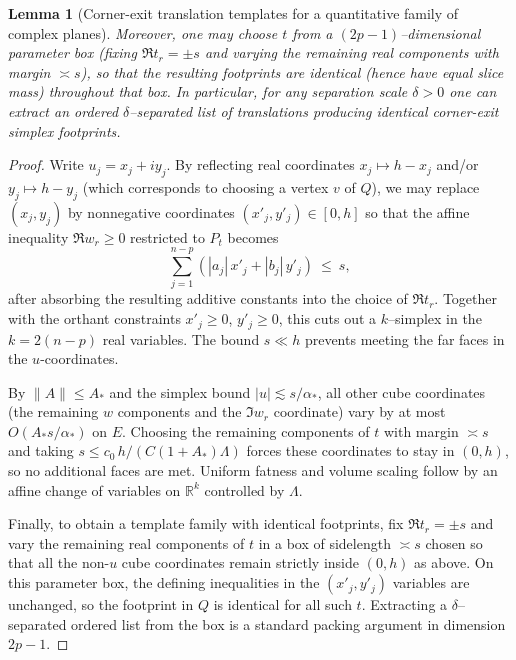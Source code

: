 \documentclass[11pt]{article}
\numberwithin{equation}{section}  %
\theoremstyle{plain}
\newtheorem{lemma}[theorem]{Lemma}
\theoremstyle{definition}
\theoremstyle{remark}
\newcommand{\R}{\mathbb{R}}
\begin{document}
\begin{lemma}[Corner-exit translation templates for a quantitative family of complex planes]
\smallskip\noindent
Moreover, one may choose $t$ from a $(2p\!-\!1)$--dimensional parameter box (fixing $\Re t_r=\pm s$ and varying the remaining real components with margin $\asymp s$),
so that the resulting footprints are \emph{identical} (hence have equal slice mass) throughout that box.  In particular, for any separation scale $\delta>0$ one can
extract an ordered $\delta$--separated list of translations producing identical corner-exit simplex footprints.
\end{lemma}

\begin{proof}
Write $u_j=x_j+i y_j$.
By reflecting real coordinates $x_j\mapsto h-x_j$ and/or $y_j\mapsto h-y_j$ (which corresponds to choosing a vertex $v$ of $Q$),
we may replace $(x_j,y_j)$ by nonnegative coordinates $(x'_j,y'_j)\in[0,h]$ so that the affine inequality
$\Re w_r\ge 0$ restricted to $P_t$ becomes
\[
\sum_{j=1}^{n-p} (|a_j|\,x'_j+|b_j|\,y'_j)\ \le\ s,
\]
after absorbing the resulting additive constants into the choice of $\Re t_r$.
Together with the orthant constraints $x'_j\ge 0$, $y'_j\ge 0$, this cuts out a $k$--simplex in the $k=2(n-p)$ real variables.
The bound $s\ll h$ prevents meeting the far faces in the $u$-coordinates.

\smallskip\noindent
By $\|A\|\le A_*$ and the simplex bound $|u|\lesssim s/\alpha_*$, all other cube coordinates (the remaining $w$ components and the $\Im w_r$ coordinate)
vary by at most $O(A_* s/\alpha_*)$ on $E$.  Choosing the remaining components of $t$ with margin $\asymp s$ and taking
$s\le c_0\,h/(C(1+A_*)\Lambda)$ forces these coordinates to stay in $(0,h)$, so no additional faces are met.
Uniform fatness and volume scaling follow by an affine change of variables on $\R^k$ controlled by $\Lambda$.
\smallskip

\noindent
Finally, to obtain a template family with identical footprints, fix $\Re t_r=\pm s$ and vary the remaining real components of $t$
in a box of sidelength $\asymp s$ chosen so that all the non-$u$ cube coordinates remain strictly inside $(0,h)$ as above.
On this parameter box, the defining inequalities in the $(x'_j,y'_j)$ variables are unchanged, so the footprint in $Q$ is identical for all such $t$.
Extracting a $\delta$--separated ordered list from the box is a standard packing argument in dimension $2p-1$.
\end{proof}
\end{document}
